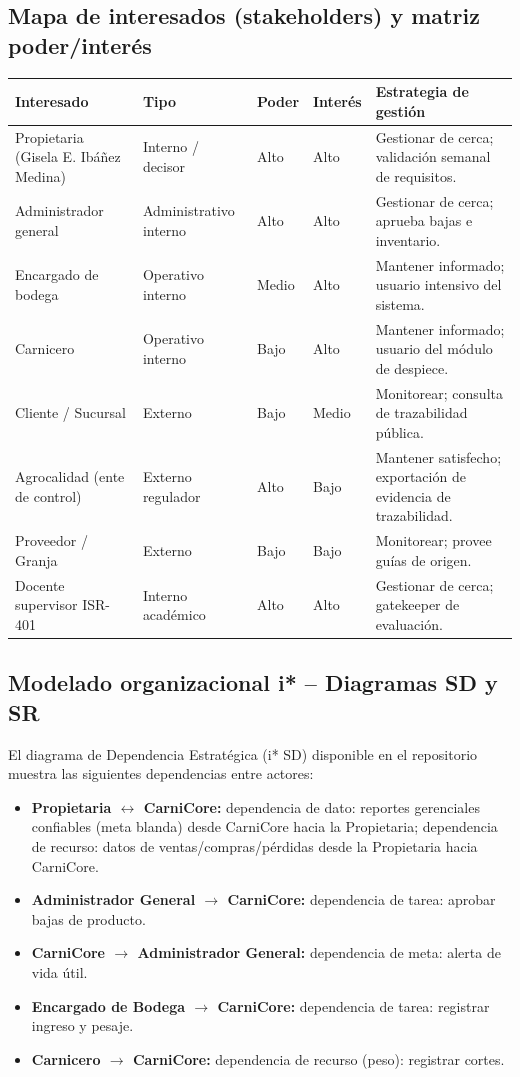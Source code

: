 \documentclass[11pt,a4paper]{article}
\begin{document}
\subsection{Mapa de interesados (stakeholders) y matriz poder/interés}
\begin{longtable}{|p{3.2cm}|p{2.5cm}|p{2cm}|p{2cm}|p{5cm}|}
\hline
\textbf{Interesado} & \textbf{Tipo} & \textbf{Poder} & \textbf{Interés} & \textbf{Estrategia de gestión} \\
\hline
Propietaria (Gisela E. Ibáñez Medina) & Interno / decisor & Alto & Alto & Gestionar de cerca; validación semanal de requisitos. \\
\hline
Administrador general & Administrativo interno & Alto & Alto & Gestionar de cerca; aprueba bajas e inventario. \\
\hline
Encargado de bodega & Operativo interno & Medio & Alto & Mantener informado; usuario intensivo del sistema. \\
\hline
Carnicero & Operativo interno & Bajo & Alto & Mantener informado; usuario del módulo de despiece. \\
\hline
Cliente / Sucursal & Externo & Bajo & Medio & Monitorear; consulta de trazabilidad pública. \\
\hline
Agrocalidad (ente de control) & Externo regulador & Alto & Bajo & Mantener satisfecho; exportación de evidencia de trazabilidad. \\
\hline
Proveedor / Granja & Externo & Bajo & Bajo & Monitorear; provee guías de origen. \\
\hline
Docente supervisor ISR-401 & Interno académico & Alto & Alto & Gestionar de cerca; gatekeeper de evaluación. \\
\hline
\end{longtable}

\subsection{Modelado organizacional i* -- Diagramas SD y SR}

El diagrama de Dependencia Estratégica (i* SD) disponible en el repositorio muestra las siguientes dependencias entre actores:

\begin{itemize}[nosep]
\item \textbf{Propietaria $\leftrightarrow$ CarniCore:} dependencia de dato: reportes gerenciales confiables (meta blanda) desde CarniCore hacia la Propietaria; dependencia de recurso: datos de ventas/compras/pérdidas desde la Propietaria hacia CarniCore.
\item \textbf{Administrador General $\rightarrow$ CarniCore:} dependencia de tarea: aprobar bajas de producto.
\item \textbf{CarniCore $\rightarrow$ Administrador General:} dependencia de meta: alerta de vida útil.
\item \textbf{Encargado de Bodega $\rightarrow$ CarniCore:} dependencia de tarea: registrar ingreso y pesaje.
\item \textbf{Carnicero $\rightarrow$ CarniCore:} dependencia de recurso (peso): registrar cortes.
\end{itemize}
\end{document}
